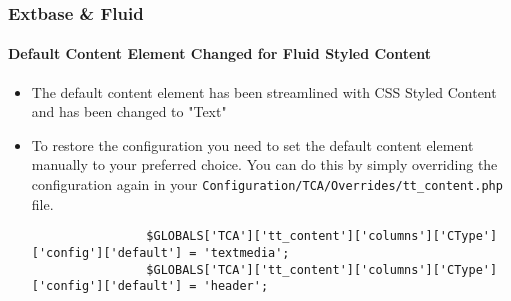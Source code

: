 
\begin{frame}[fragile]
	\frametitle{Extbase \& Fluid}
	\framesubtitle{Default Content Element Changed for Fluid Styled Content}

	\lstset{basicstyle=\tiny\ttfamily}

	\begin{itemize}
		\item The default content element has been streamlined with CSS Styled Content and has been changed to "Text"
		\item To restore the configuration you need to set the default content element manually to your preferred choice.
			You can do this by simply overriding the configuration again in your
			\texttt{Configuration/TCA/Overrides/tt\_content.php} file.

			\begin{lstlisting}
				$GLOBALS['TCA']['tt_content']['columns']['CType']['config']['default'] = 'textmedia';
				$GLOBALS['TCA']['tt_content']['columns']['CType']['config']['default'] = 'header';
			\end{lstlisting}

	\end{itemize}

\end{frame}


